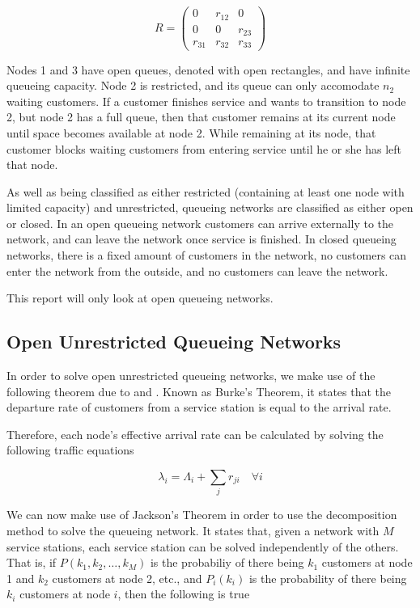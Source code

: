 \documentclass{article}
\begin{document}
\begin{equation*}
R = \left(
\begin{matrix}
  0 & r_{12} & 0 \\
  0 & 0 & r_{23} \\
  r_{31} & r_{32} & r_{33}
 \end{matrix}
 \right)
\end{equation*}

Nodes 1 and 3 have open queues, denoted with open rectangles, and have infinite queueing capacity.
Node 2 is restricted, and its queue can only accomodate $n_2$ waiting customers.
If a customer finishes service and wants to transition to node 2, but node 2 has a full queue, then that customer remains at its current node until space becomes available at node 2.
While remaining at its node, that customer blocks waiting customers from entering service until he or she has left that node.

As well as being classified as either restricted (containing at least one node with limited capacity) and unrestricted, queueing networks are classified as either open or closed.
In an open queueing network customers can arrive externally to the network, and can leave the network once service is finished.
In closed queueing networks, there is a fixed amount of customers in the network, no customers can enter the network from the outside, and no customers can leave the network.

This report will only look at open queueing networks.


\subsection{Open Unrestricted Queueing Networks}
In order to solve open unrestricted queueing networks, we make use of the following theorem due to \cite{burke56} and \cite{reich57}.
Known as Burke's Theorem, it states that the departure rate of customers from a service station is equal to the arrival rate.

Therefore, each node's effective arrival rate can be calculated by solving the following traffic equations

\begin{equation}
    \lambda_i = \Lambda_i + \sum_j r_{ji} \quad \forall i
\end{equation}

We can now make use of Jackson's Theorem \cite{jackson57} in order to use the decomposition method to solve the queueing network.
It states that, given a network with $M$ service stations, each service station can be solved independently of the others.
That is, if $P(k_1, k_2, \dotsc, k_M)$ is the probabiliy of there being $k_1$ customers at node 1 and $k_2$ customers at node 2, etc., and $P_i(k_i)$ is the probability of there being $k_i$ customers at node $i$, then the following is true
\end{document}
